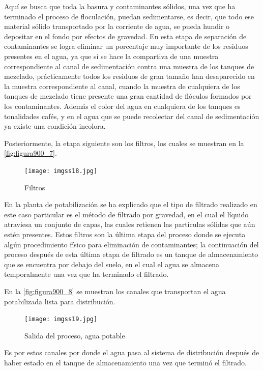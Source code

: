 Aquí se busca que toda la basura y contaminantes sólidos, una vez que ha terminado el proceso de floculación, puedan sedimentarse, es decir, que todo ese material sólido transportado por la corriente de agua, se pueda hundir 
o depositar en el fondo por efectos de gravedad. En esta etapa de separación de contaminantes se logra eliminar un porcentaje muy importante de los residuos presentes en el agua, ya que si se hace la compartiva de una muestra
correspondiente al canal de sedimentación contra una muestra de los tanques de mezclado, prácticamente todos los residuos de gran tamaño han desaparecido en la muestra correspondiente al canal, cuando la muestra de cualquiera
de los tanques de mezclado tiene presente una gran cantidad de flóculos formados por los contaminantes. Además el color del agua en cualquiera de los tanques es tonalidades cafés, y en el agua que se puede recolectar del 
canal de sedimentación ya existe una condición incolora.

\clearpage

Posteriormente, la etapa siguiente son los filtros, los cuales se muestran en la \autoref{fig:figura900_7}.

\begin{figure}[h]
	\centering
	\texttt{[image: imgss18.jpg]}
	\caption{Filtros}
	\label{fig:figura900_7}
\end{figure}

En la planta de potabilización se ha explicado que el tipo de filtrado realizado en este caso particular es el método de filtrado por gravedad, en el cual el líquido atraviesa un conjunto de capas, las cuales retienen las 
particulas sólidas que aún estén presentes. Estos filtros son la última etapa del proceso donde se ejecuta algún procedimiento físico para eliminación de contaminantes; la continuación del proceso después de esta última 
etapa de filtrado es un tanque de almacenamiento que se encuentra por debajo del suelo, en el cual el agua se almacena temporalmente una vez que ha terminado el filtrado.  

En la \autoref{fig:figura900_8} se muestran los canales que transportan el agua potabilizada lista para distribución.

\clearpage

\begin{figure}[h]
	\centering
	\texttt{[image: imgss19.jpg]}
	\caption{Salida del proceso, agua potable}
	\label{fig:figura900_8}
\end{figure}

Es por estos canales por donde el agua pasa al sistema de distribución después de haber estado en el tanque de almacenamiento una vez que terminó el filtrado. 

